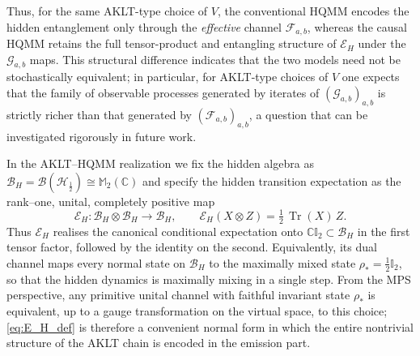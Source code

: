 \documentclass[11pt,a4paper]{article}
\begin{document}
Thus, for the same AKLT-type choice of $V$, the conventional HQMM encodes the hidden entanglement only through the \emph{effective} channel $\mathcal{F}_{a,b}$, whereas the causal HQMM retains the full tensor-product and entangling structure of $\mathcal{E}_{H}$ under the $\mathcal{G}_{a,b}$ maps. This structural difference indicates that the two models need not be stochastically equivalent; in particular, for AKLT-type choices of $V$ one expects that the family of observable processes generated by iterates of $(\mathcal{G}_{a,b})_{a,b}$ is strictly richer than that generated by $(\mathcal{F}_{a,b})_{a,b}$, a question that can be investigated rigorously in future work.



In the AKLT–HQMM realization we fix the hidden algebra as $\mathcal{B}_H=\mathcal{B}(\mathcal{H}_{\frac{1}{2}})\cong\mathbb{M}_2(\mathbb{C})$ and specify the hidden transition expectation as the rank–one, unital, completely positive map
\begin{equation}\label{eq:E_H_def}
\mathcal{E}_{H}:\mathcal{B}_H\otimes\mathcal{B}_H\longrightarrow\mathcal{B}_H,
\qquad
\mathcal{E}_{H}(X\otimes Z)
=
\tfrac{1}{2}\,\operatorname{Tr}(X)\,Z.
\end{equation}
Thus $\mathcal{E}_H$ realises the canonical conditional expectation onto $\mathbb{C}\mathbb{I}_2\subset\mathcal{B}_H$ in the first tensor factor, followed by the identity on the second. Equivalently, its dual channel maps every normal state on $\mathcal{B}_H$ to the maximally mixed state $\rho_*=\tfrac{1}{2}\mathbb{I}_2$, so that the hidden dynamics is maximally mixing in a single step. From the MPS perspective, any primitive unital channel with faithful invariant state $\rho_*$ is equivalent, up to a gauge transformation on the virtual space, to this choice; \eqref{eq:E_H_def} is therefore a convenient normal form in which the entire nontrivial structure of the AKLT chain is encoded in the emission part.
\end{document}
